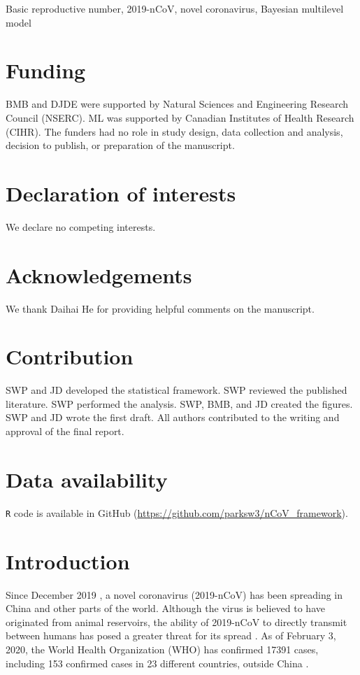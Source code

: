 \documentclass[12pt]{article}
\begin{document}
Basic reproductive number, 2019-nCoV, novel coronavirus, Bayesian multilevel model

\section*{Funding}

BMB and DJDE were supported by Natural Sciences and Engineering Research Council (NSERC). ML was supported by Canadian Institutes of Health Research (CIHR). The funders had no role in study design, data collection and analysis, decision to publish, or preparation of the manuscript.

\section*{Declaration of interests}

We declare no competing interests.

\section*{Acknowledgements}

We thank Daihai He for providing helpful comments on the manuscript.

\section*{Contribution}

SWP and JD developed the statistical framework. 
SWP reviewed the published literature.
SWP performed the analysis. 
SWP, BMB, and JD created the figures. 
SWP and JD wrote the first draft.
All authors contributed to the writing and approval of the final report.

\section*{Data availability}

\texttt{R} code is available in GitHub (\url{https://github.com/parksw3/nCoV_framework}).

\pagebreak

\section{Introduction}

Since December 2019 \cite{pneumonia}, a novel coronavirus (2019-nCoV) has been spreading in China and other parts of the world.
Although the virus is believed to have originated from animal reservoirs, the ability of 2019-nCoV to directly transmit between humans has posed a greater threat for its spread \cite{chan2020familial}.
As of February 3, 2020, the World Health Organization (WHO) has confirmed 17391 cases, including 153 confirmed cases in 23 different countries, outside China \cite{who02report}.
\end{document}
